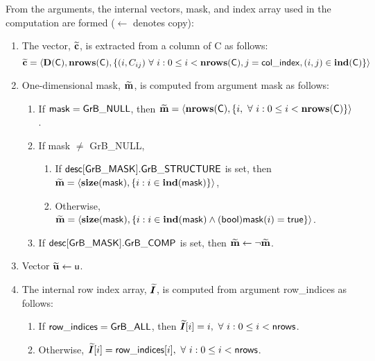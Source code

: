 From the arguments, the internal vectors, mask, and index array used in 
the computation are formed ($\leftarrow$ denotes copy):
\begin{enumerate}
	\item The vector, ${\bf \widetilde{c}}$, is extracted from a column of {\sf C}
    as follows:
    \[
        {\bf \widetilde{c}} = \langle  \bold{D}({\sf C}), \bold{nrows}({\sf C}), 
        \{ (i, C_{ij}) \ \forall \ i : 0 \leq i < \bold{nrows}({\sf C}),
        j = {\sf col\_index}, (i, j) \in \bold{ind}({\sf C})\} \rangle
    \]

	\item One-dimensional mask, ${\bf \widetilde{m}}$, is computed from 
    argument {\sf mask} as follows:
	\begin{enumerate}
		\item If ${\sf mask} = {\sf GrB\_NULL}$, then ${\bf \widetilde{m}} = 
        \langle \bold{nrows}({\sf C}), \{i, \ \forall \ i : 0 \leq i < 
        \bold{nrows}({\sf C}) \} \rangle$.

		\item If {\sf mask} $\ne$ {\sf GrB\_NULL},  
        \begin{enumerate}
            \item If ${\sf desc[GrB\_MASK].GrB\_STRUCTURE}$ is set, then
            ${\bf \widetilde{m}} = 
            \langle \bold{size}({\sf mask}), \{i : i \in \bold{ind}({\sf mask}) \} \rangle$,
            \item Otherwise, ${\bf \widetilde{m}} = 
            \langle \bold{size}({\sf mask}), \{i : i \in \bold{ind}({\sf mask}) \wedge
            ({\sf bool}){\sf mask}(i) = {\sf true} \} \rangle$.
        \end{enumerate}

		\item	If ${\sf desc[GrB\_MASK].GrB\_COMP}$ is set, then 
        ${\bf \widetilde{m}} \leftarrow \neg {\bf \widetilde{m}}$.
	\end{enumerate}

	\item Vector ${\bf \widetilde{u}} \leftarrow {\sf u}$.
    
    \item The internal row index array, $\bm{\widetilde{I}}$, is computed from 
    argument {\sf row\_indices} as follows:
	\begin{enumerate}
		\item	If ${\sf row\_indices} = {\sf GrB\_ALL}$, then 
        $\bm{\widetilde{I}}[i] = i, \ \forall \ i : 0 \leq i < {\sf nrows}$.

		\item	Otherwise, $\bm{\widetilde{I}}[i] = {\sf row\_indices}[i], 
        \ \forall \ i : 0 \leq i < {\sf nrows}$.
    \end{enumerate}
\end{enumerate}

